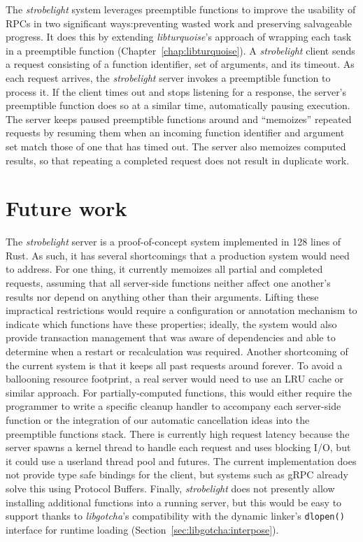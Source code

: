 The \textit{strobelight} system leverages preemptible functions to improve the
usability of RPCs in two significant ways:\@ preventing wasted work and preserving
salvageable progress.  It does this by extending \textit{libturquoise}'s approach of
wrapping each task in a preemptible function (Chapter~\ref{chap:libturquoise}).  A
\textit{strobelight} client sends a request consisting of a function identifier, set
of arguments, and its timeout.  As each request arrives, the \textit{strobelight}
server invokes a preemptible function to process it.  If the client times out and
stops listening for a response, the server's preemptible function does so at a
similar time, automatically pausing execution.  The server keeps paused preemptible
functions around and ``memoizes'' repeated requests by resuming them when an incoming
function identifier and argument set match those of one that has timed out.  The
server also memoizes computed results, so that repeating a completed request does not
result in duplicate work.


\section{Future work}

The \textit{strobelight} server is a proof-of-concept system implemented in 128 lines
of Rust.  As such, it has several shortcomings that a production system would need to
address.  For one thing, it currently memoizes all partial and completed requests,
assuming that all server-side functions neither affect one another's results nor
depend on anything other than their arguments.  Lifting these impractical
restrictions would require a configuration or annotation mechanism to indicate which
functions have these properties; ideally, the system would also provide transaction
management that was aware of dependencies and able to determine when a
restart or recalculation was required.  Another shortcoming of the current system is
that it keeps all past requests around forever.  To avoid a ballooning resource
footprint, a real server would need to use an LRU cache or similar approach.  For
partially-computed functions, this would either require the programmer to write a
specific cleanup handler to accompany each server-side function or the integration of
our automatic cancellation ideas into the preemptible functions stack.  There is
currently high request latency because the server spawns a kernel thread to handle
each request and uses blocking I/O, but it could use a userland thread pool and
futures.  The current
implementation does not provide type safe bindings for the client, but systems such
as gRPC already solve this using Protocol Buffers.  Finally, \textit{strobelight}
does not presently allow installing additional functions into a running server, but
this would be easy to support thanks to \textit{libgotcha}'s compatibility with the
dynamic linker's \texttt{dlopen()} interface for runtime loading
(Section~\ref{sec:libgotcha:interpose}).


